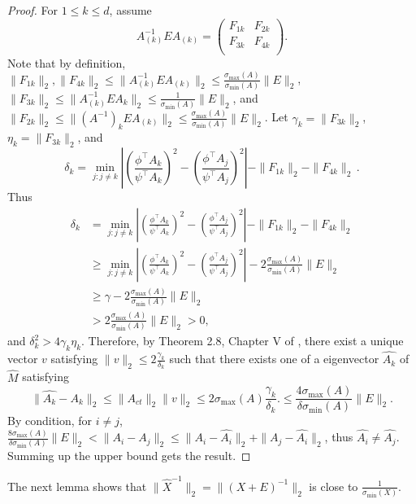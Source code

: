 \documentclass[english]{article} %
\theoremstyle{definition}
\begin{document}
\begin{proof}
For $1\le k\le d$, assume 
\[
A_{(k)}^{-1} E A_{(k)} =  
\left(
\begin{array}{cc}
F_{1k} & F_{2k}\\
F_{3k} & F_{4k} \\
\end{array} 
\right). 
\] 
Note that by definition, $\|F_{1k}\|_2,\|F_{4k}\|_2\le\|A_{(k)}^{-1} E A_{(k)}\|_2\le\frac{\sigma_{\max}(A)}{\sigma_{\min}(A)}\|E\|_2$,
 $\|F_{3k}\|_2\le\|A_{(k)}^{-1}EA_{k}\|_2\le\frac{1}{\sigma_{\min}(A)}\|E\|_2$,
 and $\|F_{2k}\|_2\le\|(A^{-1})_kEA_{(k)}\|_2\le\frac{\sigma_{\max}(A)}{\sigma_{\min}(A)}\|E\|_2$.
Let $\gamma_k = \|F_{3k}\|_2$, $\eta_k = \|F_{3k}\|_2$, and 
\[
\delta_k = \min_{j: j\neq k} 
\left\vert \left(\frac{\phi^{\top}A_k}{\psi^{\top}A_k}\right)^2 -\left( \frac{\phi^{\top}A_j}{\psi^{\top}A_j}\right)^2 \right\vert - \|F_{1k}\|_2 - \|F_{4k}\|_2\,.
\]
Thus 
\begin{align*}
\delta_k & = \min_{j:j\neq k} 
	\left\vert \left(\frac{\phi^{\top}A_k}{\psi^{\top}A_k}\right)^2 - \left(\frac{\phi^{\top}A_j}{\psi^{\top}A_j}\right)^2 \right\vert - \|F_{1k}\|_2 - \|F_{4k}\|_2\\
	& \ge \min_{j:j\neq k} \left\vert \left(\frac{\phi^{\top}A_k}{\psi^{\top}A_k}\right)^2 - \left(\frac{\phi^{\top}A_j}{\psi^{\top}A_j}\right)^2 \right\vert - 2 \frac{\sigma_{\max}(A)}{\sigma_{\min}(A)}\|E\|_2\\
	& \ge  \gamma -  2 \frac{\sigma_{\max}(A)}{\sigma_{\min}(A)}\|E\|_2\\
	& >  2 \frac{\sigma_{\max}(A)}{\sigma_{\min}(A)}\|E\|_2 >0,
\end{align*}
and $\delta_k^2 > 4\gamma_k\eta_k$. 
Therefore, by Theorem 2.8, Chapter V of \citep{stewart1990matrix}, there exist a unique vector $v$ satisfying $\|v\|_2\le 2\frac{\gamma_k}{\delta_k}$ such that there exists one of a eigenvector $\widehat{A_k}$ of $\widehat{M}$ satisfying
 \[
 \|\widehat{A_k} - A_k\|_2 \le \|A_{ct}\|_2 \|v\|_2 \le 2\sigma_{\max}(A)\frac{\gamma_k}{\delta_k}.\le \frac{4\sigma_{\max}(A)}{\delta \sigma_{\min}(A) } \|E\|_2.
 \]
 By condition, for $i\neq j$,  $\frac{8\sigma_{\max}(A)}{\delta \sigma_{\min}(A) } \|E\|_2 < \|A_i - A_j\|_2\le \|A_i - \widehat{A_i}\|_2 + \|A_j - \widehat{A_i}\|_2$, thus $\widehat{A_i} \neq \widehat{A_j}$.  Summing up the upper bound gets the result. 
\end{proof}

The next lemma shows that $\|\widehat{X}^{-1}\|_2 = \|(X+E)^{-1}\|_2$ is close to $\frac{1}{\sigma_{\min}(X)}$.
\end{document}

